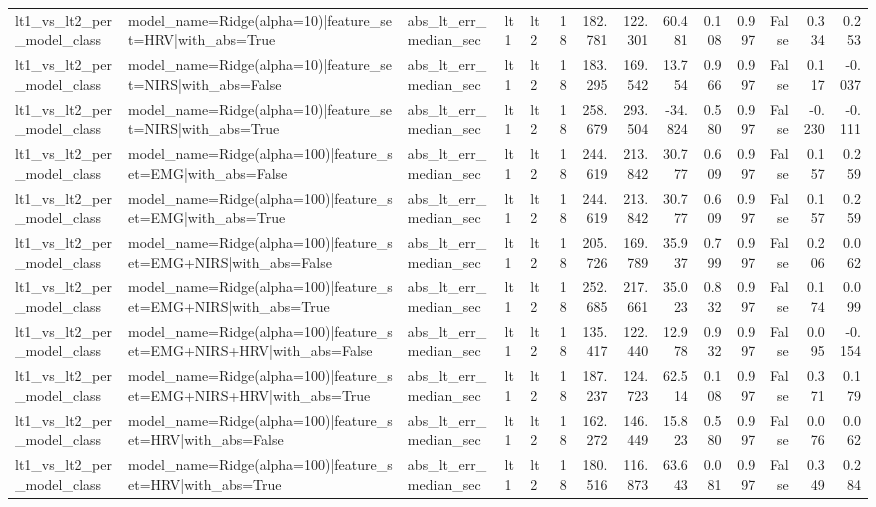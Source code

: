 \begin{table}
\begin{tabular}{lllllrrrrrrrrr}
lt1_vs_lt2_per_model_class & model_name=Ridge(alpha=10)|feature_set=HRV|with_abs=True & abs_lt_err_median_sec & lt1 & lt2 & 18 & 182.781 & 122.301 & 60.481 & 0.108 & 0.997 & False & 0.334 & 0.253 \\
lt1_vs_lt2_per_model_class & model_name=Ridge(alpha=10)|feature_set=NIRS|with_abs=False & abs_lt_err_median_sec & lt1 & lt2 & 18 & 183.295 & 169.542 & 13.754 & 0.966 & 0.997 & False & 0.117 & -0.037 \\
lt1_vs_lt2_per_model_class & model_name=Ridge(alpha=10)|feature_set=NIRS|with_abs=True & abs_lt_err_median_sec & lt1 & lt2 & 18 & 258.679 & 293.504 & -34.824 & 0.580 & 0.997 & False & -0.230 & -0.111 \\
lt1_vs_lt2_per_model_class & model_name=Ridge(alpha=100)|feature_set=EMG|with_abs=False & abs_lt_err_median_sec & lt1 & lt2 & 18 & 244.619 & 213.842 & 30.777 & 0.609 & 0.997 & False & 0.157 & 0.259 \\
lt1_vs_lt2_per_model_class & model_name=Ridge(alpha=100)|feature_set=EMG|with_abs=True & abs_lt_err_median_sec & lt1 & lt2 & 18 & 244.619 & 213.842 & 30.777 & 0.609 & 0.997 & False & 0.157 & 0.259 \\
lt1_vs_lt2_per_model_class & model_name=Ridge(alpha=100)|feature_set=EMG+NIRS|with_abs=False & abs_lt_err_median_sec & lt1 & lt2 & 18 & 205.726 & 169.789 & 35.937 & 0.799 & 0.997 & False & 0.206 & 0.062 \\
lt1_vs_lt2_per_model_class & model_name=Ridge(alpha=100)|feature_set=EMG+NIRS|with_abs=True & abs_lt_err_median_sec & lt1 & lt2 & 18 & 252.685 & 217.661 & 35.023 & 0.832 & 0.997 & False & 0.174 & 0.099 \\
lt1_vs_lt2_per_model_class & model_name=Ridge(alpha=100)|feature_set=EMG+NIRS+HRV|with_abs=False & abs_lt_err_median_sec & lt1 & lt2 & 18 & 135.417 & 122.440 & 12.978 & 0.932 & 0.997 & False & 0.095 & -0.154 \\
lt1_vs_lt2_per_model_class & model_name=Ridge(alpha=100)|feature_set=EMG+NIRS+HRV|with_abs=True & abs_lt_err_median_sec & lt1 & lt2 & 18 & 187.237 & 124.723 & 62.514 & 0.108 & 0.997 & False & 0.371 & 0.179 \\
lt1_vs_lt2_per_model_class & model_name=Ridge(alpha=100)|feature_set=HRV|with_abs=False & abs_lt_err_median_sec & lt1 & lt2 & 18 & 162.272 & 146.449 & 15.823 & 0.580 & 0.997 & False & 0.076 & 0.062 \\
lt1_vs_lt2_per_model_class & model_name=Ridge(alpha=100)|feature_set=HRV|with_abs=True & abs_lt_err_median_sec & lt1 & lt2 & 18 & 180.516 & 116.873 & 63.643 & 0.081 & 0.997 & False & 0.349 & 0.284 \\

\end{tabular}
\end{table}

